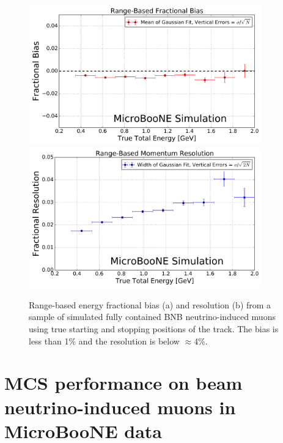 \documentclass[a4paper,11pt]{article}
\begin{document}
\begin{figure}
\centering
\includegraphics[width=0.9\textwidth]
	{Figures/true_range_bias_MCBNBMCTrack.png}
\includegraphics[width=0.9\textwidth]
	{Figures/true_range_resolution_MCBNBMCTrack.png}
\caption{Range-based energy fractional bias (a) and resolution (b) from a sample of simulated fully contained BNB neutrino-induced muons using true starting and stopping positions of the track. The bias is less than 1\% and the resolution is below $\approx$4\%.}
\label{true_range_bias_resolution_MCTrack_fig}
\end{figure}






\section{MCS performance on beam neutrino-induced muons in MicroBooNE data}\label{data_performance_section}
\end{document}
